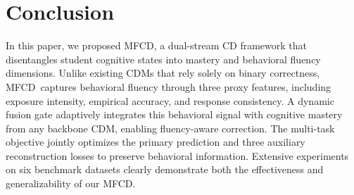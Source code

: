 \documentclass[a4paper,runningheads]{llncs}
\def\mymethod{MFCD}
\begin{document}



\section{Conclusion}
In this paper, we proposed \mymethod, a dual-stream CD framework that disentangles student cognitive states into mastery and behavioral fluency dimensions. Unlike existing CDMs that rely solely on binary correctness, \mymethod\ captures behavioral fluency through three proxy features, including exposure intensity, empirical accuracy, and response consistency. A dynamic fusion gate adaptively integrates this behavioral signal with cognitive mastery from any backbone CDM, enabling fluency-aware correction. The multi-task objective jointly optimizes the primary prediction and three auxiliary reconstruction losses to preserve behavioral information. Extensive experiments on six benchmark datasets clearly demonstrate both the effectiveness and generalizability of our \mymethod.
\end{document}
